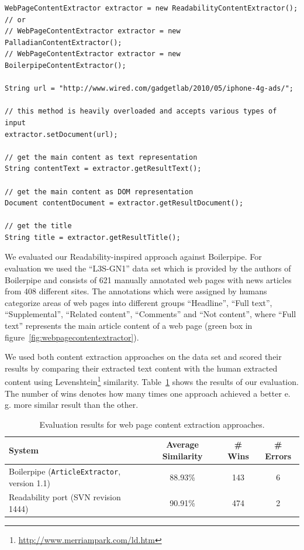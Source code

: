 \begin{codelisting}
\begin{lstlisting}[label=listing:usePageContentExtractor,caption=Using the PageContentExtractor.,frame=tb]
WebPageContentExtractor extractor = new ReadabilityContentExtractor();
// or
// WebPageContentExtractor extractor = new PalladianContentExtractor();
// WebPageContentExtractor extractor = new BoilerpipeContentExtractor();

String url = "http://www.wired.com/gadgetlab/2010/05/iphone-4g-ads/";

// this method is heavily overloaded and accepts various types of input
extractor.setDocument(url);

// get the main content as text representation
String contentText = extractor.getResultText();

// get the main content as DOM representation
Document contentDocument = extractor.getResultDocument();

// get the title
String title = extractor.getResultTitle();
\end{lstlisting}
\end{codelisting}

We evaluated our Readability-inspired approach against Boilerpipe. For evaluation we used the ``L3S-GN1'' data set which is provided by the authors of Boilerpipe and consists of 621 manually annotated web pages with news articles from 408 different sites. The annotations which were assigned by humans categorize areas of web pages into different groups ``Headline'', ``Full text'',  ``Supplemental'', ``Related content'', ``Comments'' and  ``Not content'', where ``Full text'' represents the main article content of a web page (green box in figure~\ref{fig:webpagecontentextractor}).

We used both content extraction approaches on the data set and scored their results by comparing their extracted text content with the human extracted content using Levenshtein\footnote{\url{http://www.merriampark.com/ld.htm}} similarity. Table~\ref{tab:pageContentExtractionResults} shows the results of our evaluation. The number of wins denotes how many times one approach achieved a better e. g. more similar result than the other.


\begin{table}[ht]
\centering
\begin{tabular}{|l|c|c|c|}
	\hline
	System & Average Similarity & \# Wins & \# Errors \\ 
	\hline
	Boilerpipe (\texttt{ArticleExtractor}, version 1.1) & 88.93\% & 143 & 6 \\ 
	\hline
	Readability port (SVN revision 1444) & 90.91\% & 474 & 2 \\ 
	\hline
\end{tabular}
\caption{Evaluation results for web page content extraction approaches.}
\label{tab:pageContentExtractionResults}
\end{table}

